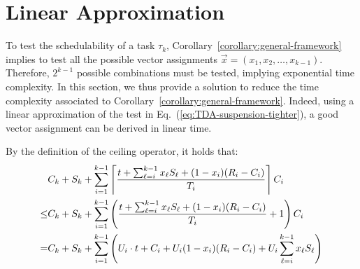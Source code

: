\section{Linear Approximation}
\label{sec:linear-approximation}

To test the schedulability of a task $\tau_k$,
Corollary~\ref{corollary:general-framework} implies to test all the
possible vector assignments $\vec{x} = (x_1, x_2, \ldots, x_{k-1})$. Therefore, $2^{k-1}$ possible combinations must be tested, implying exponential time complexity. In this section, we thus provide a solution to reduce the time complexity associated to
Corollary~\ref{corollary:general-framework}. Indeed, using a linear approximation of the test in Eq.~(\ref{eq:TDA-suspension-tighter}), a good vector assignment can be derived in linear time. 

By the definition of the ceiling operator, it holds that:
{\footnotesize \begin{align}
&C_k + S_k + \sum_{i=1}^{k-1}\ceiling{\frac{t+\sum_{\ell=i}^{k-1}x_\ell S_\ell+(1-x_i)(R_i-C_i)}{T_i}} C_i \nonumber\\
\leq& C_k + S_k  +   \sum_{i=1}^{k-1} \left(\frac{t+\sum_{\ell=i}^{k-1}x_\ell S_\ell +(1-x_i)(R_i-C_i)}{T_i} +1\right) C_i \nonumber\\
=& C_k + S_k  + \sum_{i=1}^{k-1} \left(U_i\cdot t + C_i+U_i (1-x_i)(R_i-C_i) + U_i\sum_{\ell=i}^{k-1}x_\ell S_\ell \right) \label{eq:linear_step1}
\end{align}}




